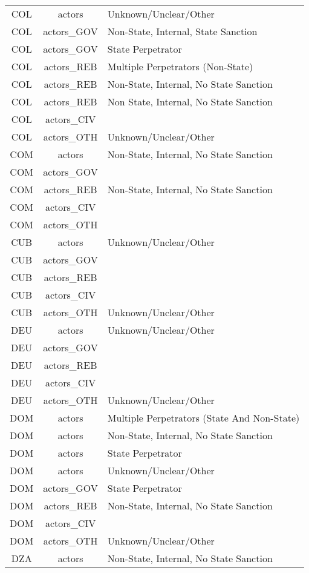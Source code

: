 \documentclass[12pt]{article}
\begin{document}
\begin{center}
\begin{longtable}{|c|c|p{10cm}|}
  COL & actors & Unknown/Unclear/Other \\ 
  COL & actors\_GOV & Non-State, Internal, State Sanction \\ 
  COL & actors\_GOV & State Perpetrator \\ 
  COL & actors\_REB & Multiple Perpetrators (Non-State) \\ 
  COL & actors\_REB & Non-State, Internal, No State Sanction \\ 
  COL & actors\_REB & Non State, Internal, No State Sanction \\ 
  COL & actors\_CIV &  \\ 
  COL & actors\_OTH & Unknown/Unclear/Other \\ 
  COM & actors & Non-State, Internal, No State Sanction \\ 
  COM & actors\_GOV &  \\ 
  COM & actors\_REB & Non-State, Internal, No State Sanction \\ 
  COM & actors\_CIV &  \\ 
  COM & actors\_OTH &  \\ 
  CUB & actors & Unknown/Unclear/Other \\ 
  CUB & actors\_GOV &  \\ 
  CUB & actors\_REB &  \\ 
  CUB & actors\_CIV &  \\ 
  CUB & actors\_OTH & Unknown/Unclear/Other \\ 
  DEU & actors & Unknown/Unclear/Other \\ 
  DEU & actors\_GOV &  \\ 
  DEU & actors\_REB &  \\ 
  DEU & actors\_CIV &  \\ 
  DEU & actors\_OTH & Unknown/Unclear/Other \\ 
  DOM & actors & Multiple Perpetrators (State And Non-State) \\ 
  DOM & actors & Non-State, Internal, No State Sanction \\ 
  DOM & actors & State Perpetrator \\ 
  DOM & actors & Unknown/Unclear/Other \\ 
  DOM & actors\_GOV & State Perpetrator \\ 
  DOM & actors\_REB & Non-State, Internal, No State Sanction \\ 
  DOM & actors\_CIV &  \\ 
  DOM & actors\_OTH & Unknown/Unclear/Other \\ 
  DZA & actors & Non-State, Internal, No State Sanction \\ 

\end{longtable}
\end{center}
\end{document}
